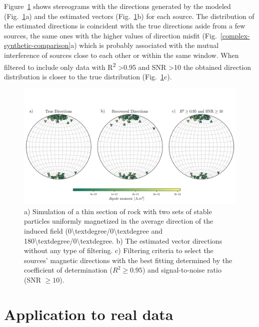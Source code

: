 Figure~\ref{complex-synthetic-stereograms} shows stereograms with the directions generated by the modeled (Fig.~\ref{complex-synthetic-stereograms}a) and the estimated vectors (Fig.~\ref{complex-synthetic-stereograms}b) for each source. The distribution of the estimated directions is coincident with the true directions aside from a few sources, the same ones with the higher values of direction misfit (Fig.~\ref{complex-synthetic-comparison}a) which is probably associated with the mutual interference of sources close to each other or within the same window. When filtered to include only data with R\textsuperscript{2} \textgreater 0.95 and SNR \textgreater 10 the obtained direction distribution is closer to the true distribution (Fig.~\ref{complex-synthetic-stereograms}c).

\begin{figure}[htbp!]
\centering
\includegraphics[width=1\linewidth]{figures/complex-synthetic-stereograms.png}
\caption{
a) Simulation of a thin section of rock with two sets of stable particles uniformly magnetized in the average direction of the induced field (0{\textbackslash}textdegree/0{\textbackslash}textdegree and 180{\textbackslash}textdegree/0{\textbackslash}textdegree. b) The estimated vector directions without any type of filtering. c) Filtering criteria to select the sources' magnetic directions with the best fitting determined by the coefficient of determination ($R^ 2 \geq 0.95$) and signal-to-noise ratio (SNR $ \geq 10$).
}
\label{complex-synthetic-stereograms}
\end{figure}



\section{Application to real data}

